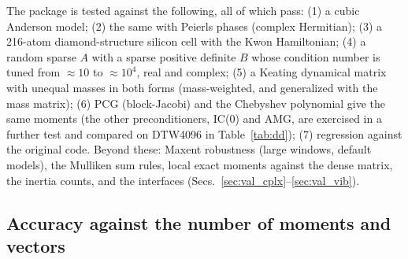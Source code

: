 \documentclass[reprint,nofootinbib,superscriptaddress,amsmath,amssymb,aps,prb,floatfix]{revtex4-2}
\begin{document}
The package is tested against the following, all of which pass: (1) a cubic Anderson model; (2) the same with Peierls phases (complex Hermitian); (3) a 216-atom diamond-structure silicon cell with the Kwon Hamiltonian; (4) a random sparse $A$ with a sparse positive definite $B$ whose condition number is tuned from $\approx10$ to $\approx10^4$, real and complex; (5) a Keating \cite{keating} dynamical matrix with unequal masses in both forms (mass-weighted, and generalized with the mass matrix); (6) PCG (block-Jacobi) and the Chebyshev polynomial give the same moments (the other preconditioners, IC(0) and AMG, are exercised in a further test and compared on DTW4096 in Table~\ref{tab:dd}); (7) regression against the original code.
Beyond these: Maxent robustness (large windows, default models), the Mulliken sum rules, local exact moments against the dense matrix, the inertia counts, and the interfaces (Secs.~\ref{sec:val_cplx}--\ref{sec:val_vib}).

\subsection{Accuracy against the number of moments and vectors}
\label{sec:val_acc}
\end{document}
